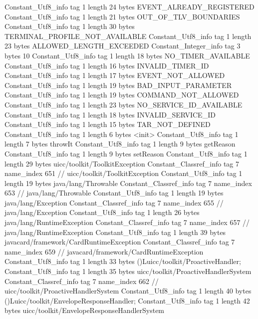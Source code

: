 {{{		}
		Constant_Utf8_info {
			tag	1
			length	24
			bytes	EVENT_ALREADY_REGISTERED
		}
		Constant_Utf8_info {
			tag	1
			length	21
			bytes	OUT_OF_TLV_BOUNDARIES
		}
		Constant_Utf8_info {
			tag	1
			length	30
			bytes	TERMINAL_PROFILE_NOT_AVAILABLE
		}
		Constant_Utf8_info {
			tag	1
			length	23
			bytes	ALLOWED_LENGTH_EXCEEDED
		}
		Constant_Integer_info {
			tag	3
			bytes	10
		}
		Constant_Utf8_info {
			tag	1
			length	18
			bytes	NO_TIMER_AVAILABLE
		}
		Constant_Utf8_info {
			tag	1
			length	16
			bytes	INVALID_TIMER_ID
		}
		Constant_Utf8_info {
			tag	1
			length	17
			bytes	EVENT_NOT_ALLOWED
		}
		Constant_Utf8_info {
			tag	1
			length	19
			bytes	BAD_INPUT_PARAMETER
		}
		Constant_Utf8_info {
			tag	1
			length	19
			bytes	COMMAND_NOT_ALLOWED
		}
		Constant_Utf8_info {
			tag	1
			length	23
			bytes	NO_SERVICE_ID_AVAILABLE
		}
		Constant_Utf8_info {
			tag	1
			length	18
			bytes	INVALID_SERVICE_ID
		}
		Constant_Utf8_info {
			tag	1
			length	15
			bytes	TAR_NOT_DEFINED
		}
		Constant_Utf8_info {
			tag	1
			length	6
			bytes	<init>
		}
		Constant_Utf8_info {
			tag	1
			length	7
			bytes	throwIt
		}
		Constant_Utf8_info {
			tag	1
			length	9
			bytes	getReason
		}
		Constant_Utf8_info {
			tag	1
			length	9
			bytes	setReason
		}
		Constant_Utf8_info {
			tag	1
			length	29
			bytes	uicc/toolkit/ToolkitException
		}
		Constant_Classref_info {
			tag	7
			name_index	651		// uicc/toolkit/ToolkitException
		}
		Constant_Utf8_info {
			tag	1
			length	19
			bytes	java/lang/Throwable
		}
		Constant_Classref_info {
			tag	7
			name_index	653		// java/lang/Throwable
		}
		Constant_Utf8_info {
			tag	1
			length	19
			bytes	java/lang/Exception
		}
		Constant_Classref_info {
			tag	7
			name_index	655		// java/lang/Exception
		}
		Constant_Utf8_info {
			tag	1
			length	26
			bytes	java/lang/RuntimeException
		}
		Constant_Classref_info {
			tag	7
			name_index	657		// java/lang/RuntimeException
		}
		Constant_Utf8_info {
			tag	1
			length	39
			bytes	javacard/framework/CardRuntimeException
		}
		Constant_Classref_info {
			tag	7
			name_index	659		// javacard/framework/CardRuntimeException
		}
		Constant_Utf8_info {
			tag	1
			length	33
			bytes	()Luicc/toolkit/ProactiveHandler;
		}
		Constant_Utf8_info {
			tag	1
			length	35
			bytes	uicc/toolkit/ProactiveHandlerSystem
		}
		Constant_Classref_info {
			tag	7
			name_index	662		// uicc/toolkit/ProactiveHandlerSystem
		}
		Constant_Utf8_info {
			tag	1
			length	40
			bytes	()Luicc/toolkit/EnvelopeResponseHandler;
		}
		Constant_Utf8_info {
			tag	1
			length	42
			bytes	uicc/toolkit/EnvelopeResponseHandlerSystem
}}}
